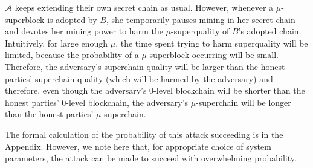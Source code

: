 $\mathcal{A}$ keeps extending their own secret chain as usual. However, whenever
a $\mu$-superblock is adopted by $B$, she temporarily pauses mining in
her secret chain and devotes her mining power to harm the $\mu$-superquality
of $B$'s adopted chain. Intuitively, for large enough $\mu$, the time spent
trying to harm superquality will be limited, because the probability of a
$\mu$-superblock occurring will be small. Therefore, the adversary's superchain
quality will be larger than the honest parties' superchain quality (which will
be harmed by the adversary) and therefore, even though the adversary's
0-level blockchain will be shorter than the honest parties' 0-level blockchain,
the adversary's $\mu$-superchain will be longer than the honest parties'
$\mu$-superchain.

The formal calculation of the probability of this attack succeeding is in the
Appendix. However, we note here that, for appropriate choice of system
parameters, the attack can be made to succeed with overwhelming probability.
